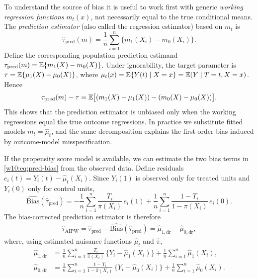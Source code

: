 \documentclass[master.tex]{subfiles}
\begin{document}
To understand the source of bias it is useful to work first with
generic \emph{working regression functions} $m_t(x)$, not necessarily
equal to the true conditional means.  The \emph{prediction estimator}
(also called the regression estimator) based on $m_t$ is
\[
  \hat\tau_{\mathrm{pred}}(m)
  = \frac{1}{n}\sum_{i=1}^n
    \bigl\{m_1(X_i) - m_0(X_i)\bigr\}.
\]
Define the corresponding population prediction estimand
$\tau_{\mathrm{pred}}(m) = \mathbb{E}\{m_1(X)-m_0(X)\}$.
Under ignorability, the target parameter is
$\tau = \mathbb{E}\{\mu_1(X)-\mu_0(X)\}$,
where $\mu_t(x)=\mathbb{E}\{Y(t)\mid X=x\}=\mathbb{E}(Y\mid T=t,X=x)$.  Hence
\begin{align}
  \tau_{\mathrm{pred}}(m) - \tau
  = \mathbb{E}\bigl[(m_1(X)-\mu_1(X)) - (m_0(X)-\mu_0(X))\bigr].
  \label{w10:eq:pred-bias}
\end{align}
This shows that the prediction estimator is unbiased only when the
working regressions equal the true outcome regressions.  In practice
we substitute fitted models $m_t = \hat\mu_t$, and the same
decomposition explains the first-order bias induced by outcome-model
misspecification.

If the propensity score model is available, we can estimate the two
bias terms in \eqref{w10:eq:pred-bias} from the observed data.
Define residuals $e_i(t) = Y_i(t) - \hat\mu_t(X_i)$.  Since
$Y_i(1)$ is observed only for treated units and $Y_i(0)$ only for
control units,
\[
  \widehat{\mathrm{Bias}}(\hat\tau_{\mathrm{pred}})
  = -\frac{1}{n}\sum_{i=1}^n \frac{T_i}{\pi(X_i)}\,e_i(1)
    + \frac{1}{n}\sum_{i=1}^n \frac{1-T_i}{1-\pi(X_i)}\,e_i(0).
\]
The bias-corrected prediction estimator is therefore
\begin{align}
  \hat\tau_{\mathrm{AIPW}}
  = \hat\tau_{\mathrm{pred}}
    - \widehat{\mathrm{Bias}}(\hat\tau_{\mathrm{pred}})
  = \hat\mu_{1,\mathrm{dr}} - \hat\mu_{0,\mathrm{dr}},
  \label{w10:eq:aipw-biascorr}
\end{align}
where, using estimated nuisance functions $\hat\mu_t$ and
$\hat\pi$,
\begin{align}
  \hat\mu_{1,\mathrm{dr}}
  &= \frac{1}{n}\sum_{i=1}^n \frac{T_i}{\hat\pi(X_i)}\,
     \bigl\{Y_i - \hat\mu_1(X_i)\bigr\}
     + \frac{1}{n}\sum_{i=1}^n \hat\mu_1(X_i),
  \label{w10:eq:mu1dr} \\[4pt]
  \hat\mu_{0,\mathrm{dr}}
  &= \frac{1}{n}\sum_{i=1}^n \frac{1-T_i}{1-\hat\pi(X_i)}\,
     \bigl\{Y_i - \hat\mu_0(X_i)\bigr\}
     + \frac{1}{n}\sum_{i=1}^n \hat\mu_0(X_i).
  \label{w10:eq:mu0dr}
\end{align}
\end{document}
